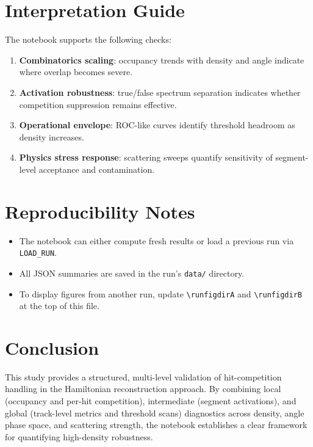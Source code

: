 \documentclass[11pt,a4paper]{article}
\begin{document}
\section{Interpretation Guide}
The notebook supports the following checks:
\begin{enumerate}[leftmargin=1.5em]
  \item \textbf{Combinatorics scaling}: occupancy trends with density and angle
  indicate where overlap becomes severe.
  \item \textbf{Activation robustness}: true/false spectrum separation indicates
  whether competition suppression remains effective.
  \item \textbf{Operational envelope}: ROC-like curves identify threshold headroom
  as density increases.
  \item \textbf{Physics stress response}: scattering sweeps quantify sensitivity of
  segment-level acceptance and contamination.
\end{enumerate}

\section{Reproducibility Notes}
\begin{itemize}[leftmargin=1.5em]
  \item The notebook can either compute fresh results or load a previous run via
  \texttt{LOAD\_RUN}.
  \item All JSON summaries are saved in the run's \texttt{data/} directory.
  \item To display figures from another run, update
  \texttt{\textbackslash runfigdirA} and \texttt{\textbackslash runfigdirB} at the top of this file.
\end{itemize}

\section{Conclusion}
This study provides a structured, multi-level validation of hit-competition
handling in the Hamiltonian reconstruction approach. By combining local
(occupancy and per-hit competition), intermediate (segment activations), and
global (track-level metrics and threshold scans) diagnostics across density,
angle phase space, and scattering strength, the notebook establishes a clear
framework for quantifying high-density robustness.
\end{document}

